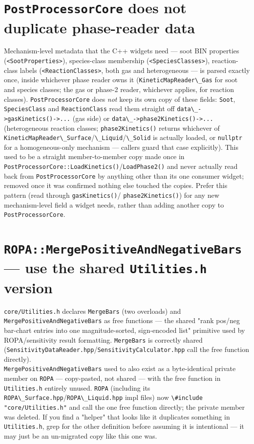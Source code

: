 \documentclass[11pt,a4paper]{report}
\newcommand{\pkg}[1]{\lstinline|#1|}
\begin{document}
\section{\texttt{PostProcessorCore} does not duplicate phase-reader data}

Mechanism-level metadata that the C++ widgets need --- soot BIN properties
(\pkg{<SootProperties>}), species-class membership (\pkg{<SpeciesClasses>}),
reaction-class labels (\pkg{<ReactionClasses>}, both gas and heterogeneous
--- is parsed exactly once, inside whichever phase reader owns it
(\pkg{KineticMapReader\_Gas} for soot and species classes; the gas or
phase-2 reader, whichever applies, for reaction classes). \pkg{PostProcessorCore}
does \emph{not} keep its own copy of these fields: \pkg{Soot},
\pkg{SpeciesClass} and \pkg{ReactionClass} read them straight off
\pkg{data\_->gasKinetics()->...} (gas side) or \pkg{data\_->phase2Kinetics()->...}
(heterogeneous reaction classes; \pkg{phase2Kinetics()} returns whichever of
\pkg{KineticMapReader\_Surface}/\pkg{\_Liquid}/\pkg{\_Solid} is actually
loaded, or \pkg{nullptr} for a homogeneous-only mechanism --- callers guard
that case explicitly). This used to be a straight member-to-member copy
made once in \pkg{PostProcessorCore::LoadKinetics()}/\pkg{LoadPhase2()} and
never actually read back from \pkg{PostProcessorCore} by anything other than
its one consumer widget; removed once it was confirmed nothing else touched
the copies. Prefer this pattern (read through \pkg{gasKinetics()}/
\pkg{phase2Kinetics()}) for any new mechanism-level field a widget needs,
rather than adding another copy to \pkg{PostProcessorCore}.

\section{\texttt{ROPA::MergePositiveAndNegativeBars} --- use the shared \texttt{Utilities.h} version}

\pkg{core/Utilities.h} declares \pkg{MergeBars} (two overloads) and
\pkg{MergePositiveAndNegativeBars} as free functions --- the shared
"rank pos/neg bar-chart entries into one magnitude-sorted, sign-encoded
list" primitive used by ROPA/sensitivity result formatting. \pkg{MergeBars}
is correctly shared \\(\pkg{SensitivityDataReader.hpp}/\pkg{SensitivityCalculator.hpp}
call the free function directly). \\\pkg{MergePositiveAndNegativeBars} used to
also exist as a byte-identical private member on \pkg{ROPA} --- copy-pasted,
not shared --- with the free function in \pkg{Utilities.h} entirely unused.
\pkg{ROPA} (including its \pkg{ROPA\_Surface.hpp}/\pkg{ROPA\_Liquid.hpp} impl
files) now \pkg{\#include "core/Utilities.h"} and call the one free function
directly; the private member was deleted. If you find a "helper" that looks
like it duplicates something in \pkg{Utilities.h}, grep for the other
definition before assuming it is intentional --- it may just be an
un-migrated copy like this one was.
\end{document}
